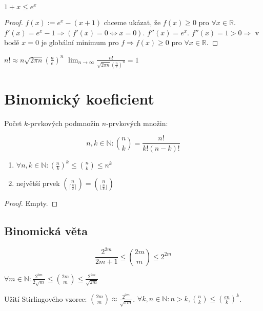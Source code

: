 \begin{lemma}
	$1+x \leq e^x$
\end{lemma}

\begin{proof}
	$f(x) := e^x - (x+1)$ chceme ukázat, že $f(x) \geq 0$ pro $\forall x \in \mathbb{R}$. $f'(x) = e^x - 1 \Rightarrow (f'(x) = 0 \Leftrightarrow x = 0)$. $f''(x) = e^x$. $f''(x) = 1 > 0 \Rightarrow$ v bodě $x = 0$ je globální minimum pro $f \Rightarrow f(x) \geq 0$ pro $\forall x \in \mathbb{R}$.
\end{proof}

\begin{veta}
	$n! \approx n \sqrt{2\pi n} (\frac{n}{e})^n$ $\lim_{n \to \infty} \frac{n!}{\sqrt{2\pi n}(\frac{n}{e})^n} = 1$
\end{veta}

\section{Binomický koeficient}

Počet $k$-prvkových podmnožin $n$-prvkových množin: 

$$
n,k \in \mathbb{N}: \binom{n}{k}=\frac{n!}{k!(n-k)!}
$$

\begin{pozor}
	\begin{enumerate}
		\item $\forall n,k \in \mathbb{N}: (\frac{n}{k})^k \leq \binom{n}{k} \leq n^k$
		\item největší prvek $\binom{n}{\lceil \frac{n}{2} \rceil} = \binom{n}{\lfloor \frac{n}{k} \rfloor}$
	\end{enumerate}	
\end{pozor}

\begin{proof}
	Empty.
\end{proof}

\subsection{Binomická věta}

$$
\frac{2^{2m}}{2m+1} \leq \binom{2m}{m} \leq 2^{2m}
$$

\begin{veta}
	$\forall m \in \mathbb{N}: \frac{2^{2m}}{2\sqrt{m}} \leq \binom{2m}{m} \leq \frac{2^{2m}}{\sqrt{2m}}$
\end{veta}

Užití Stirlingového vzorce: $\binom{2m}{m} \approx \frac{2^{2m}}{\sqrt{\pi m}}$. $\forall k,n \in \mathbb{N}: n > k, \binom{n}{k} \leq (\frac{en}{k})^k$.

